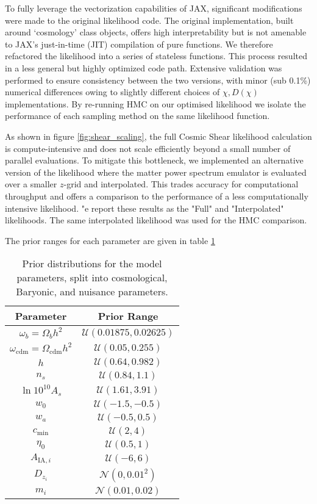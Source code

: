 \documentclass[twocolumn]{openjournal}
\begin{document}
To fully leverage the vectorization capabilities of JAX, significant modifications were made to the original likelihood code. The original implementation, built around `cosmology' class objects, offers high interpretability but is not amenable to JAX's just-in-time (JIT) compilation of pure functions. We therefore refactored the likelihood into a series of stateless functions. This process resulted in a less general but highly optimized code path. Extensive validation was performed to ensure consistency between the two versions, with minor (sub 0.1\%) numerical differences owing to slightly different choices of $\chi, D(\chi)$ implementations. By re-running HMC on our optimised likelihood we isolate the performance of each sampling method on the same likelihood function.

As shown in figure \ref{fig:shear_scaling}, the full Cosmic Shear likelihood calculation is compute-intensive and does not scale efficiently beyond a small number of parallel evaluations. To mitigate this bottleneck, we implemented an alternative version of the likelihood where the matter power spectrum emulator is evaluated over a smaller $z$-grid and interpolated. This trades accuracy for computational throughput and offers a comparison to the performance of a less computationally intensive likelihood. "e report these results as the "Full" and "Interpolated" likelihoods. The same interpolated likelihood was used for the HMC comparison.

The prior ranges for each parameter are given in table \ref{tab:shearpriors}

\begin{table}[h!]
\centering
\caption{Prior distributions for the model parameters, split into cosmological, Baryonic, and nuisance parameters.}
\label{tab:shearpriors}
\begin{tabular}{c c}
\toprule
\textbf{Parameter} & \textbf{Prior Range} \\
\midrule

$\omega_b = \Omega_b h^2$ & $\mathcal{U}(0.01875, 0.02625)$ \\
$\omega_\text{cdm} = \Omega_\text{cdm} h^2$ &  $\mathcal{U}(0.05, 0.255)$ \\
$h$ &  $\mathcal{U}(0.64, 0.982)$ \\
$n_s$ & $\mathcal{U}(0.84, 1.1)$ \\
$\ln 10^{10}A_s$ & $\mathcal{U}(1.61, 3.91)$ \\
$w_0$ &  $\mathcal{U}(-1.5, -0.5)$ \\
$w_a$ &  $\mathcal{U}(-0.5, 0.5)$ \\
\midrule
$c_\text{min}$ & $\mathcal{U}(2, 4)$ \\
$\eta_0$ & $\mathcal{U}(0.5, 1)$ \\

\midrule

$A_{\text{IA},i}$  & $\mathcal{U}(-6, 6)$ \\
$D_{z_i}$ & $\mathcal{N}(0, 0.01^2)$ \\
$m_i$   & $\mathcal{N}(0.01, 0.02)$ \\
\bottomrule
\end{tabular}
\end{table}
\end{document}
